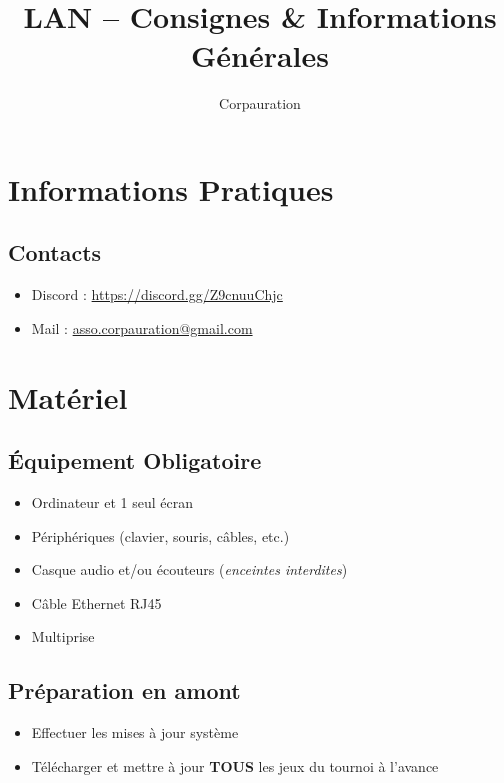 \documentclass[11pt,a4paper]{article}
\title{\textbf{LAN -- Consignes \& Informations Générales}}
\author{Corpauration}
\begin{document}
    \maketitle
    \thispagestyle{fancy}

    \tableofcontents
    \vspace{1.5em}
    \newpage


    \section{Informations Pratiques}
    \subsection{Contacts}
    \begin{itemize}
        \item Discord : \url{https://discord.gg/Z9cnuuChjc}
        \item Mail : \url{asso.corpauration@gmail.com}
    \end{itemize}


    \section{Matériel}

    \subsection{Équipement Obligatoire}
    \begin{itemize}
        \item Ordinateur et 1 seul écran
        \item Périphériques (clavier, souris, câbles, etc.)
        \item Casque audio et/ou écouteurs (\textit{enceintes interdites})
        \item Câble Ethernet RJ45
        \item Multiprise
    \end{itemize}

    \subsection{Préparation en amont}
    \begin{itemize}
        \item Effectuer les mises à jour système
        \item Télécharger et mettre à jour \textbf{TOUS} les jeux du tournoi à l'avance
    \end{itemize}
\end{document}
